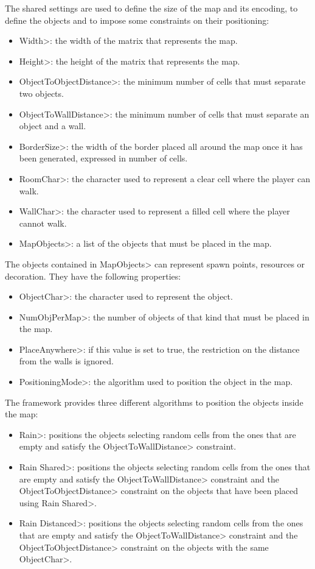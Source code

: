 \par

The shared settings are used to define the size of the map and its encoding, to define the objects and to impose some constraints on their positioning:

\begin{itemize}
\item \<Width>: the width of the matrix that represents the map.
\item \<Height>: the height of the matrix that represents the map.
\item \<ObjectToObjectDistance>: the minimum number of cells that must separate two objects. 
\item \<ObjectToWallDistance>: the minimum number of cells that must separate an object and a wall.
\item \<BorderSize>: the width of the border placed all around the map once it has been generated, expressed in number of cells.
\item \<RoomChar>: the character used to represent a clear cell where the player can walk.
\item \<WallChar>: the character used to represent a filled cell where the player cannot walk.
\item \<MapObjects>: a list of the objects that must be placed in the map.
\end{itemize}

The objects contained in \<MapObjects> can represent spawn points, resources or decoration. They have the following properties:

\begin{itemize}
\item \<ObjectChar>: the character used to represent the object.
\item \<NumObjPerMap>: the number of objects of that kind that must be placed in the map.
\item \<PlaceAnywhere>: if this value is set to true, the restriction on the distance from the walls is ignored.
\item \<PositioningMode>: the algorithm used to position the object in the map.
\end{itemize}

The framework provides three different algorithms to position the objects inside the map:

\begin{itemize}
\item \<Rain>: positions the objects selecting random cells from the ones that are empty and satisfy the \<ObjectToWallDistance> constraint.
\item \<Rain Shared>: positions the objects selecting random cells from the ones that are empty and satisfy the \<ObjectToWallDistance> constraint and the \<ObjectToObjectDistance> constraint on the objects that have been placed using \<Rain Shared>.
\item \<Rain Distanced>: positions the objects selecting random cells from the ones that are empty and satisfy the \<ObjectToWallDistance> constraint and the \<ObjectToObjectDistance> constraint on the objects with the same \<ObjectChar>.
\end{itemize}

